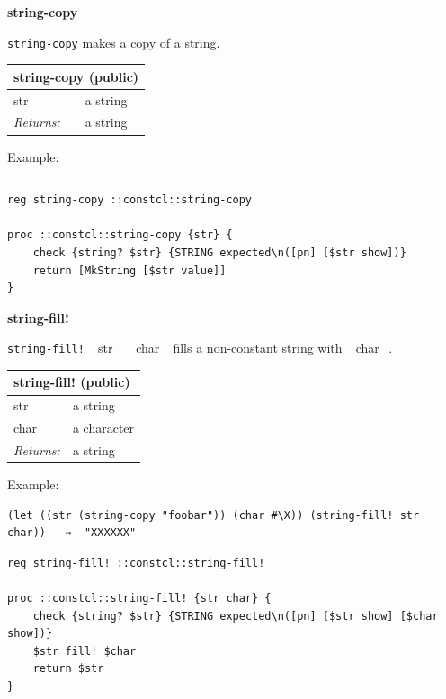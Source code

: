 \documentclass[twoside,9pt]{report}
\begin{document}
\textbf{string-copy}


\texttt{string-copy} makes a copy of a string.

\begin{tabular}{ |l l| }
\hline
\multicolumn{2}{|l|}{string-copy (public)} \\
\hline
str & a string \\
\textit{Returns:} & a string \\
\hline
\end{tabular}


Example:

\noindent\makebox[\linewidth]{\rule{\linewidth}{0.4pt}}
\begin{lstlisting}
\end{lstlisting}
\noindent\makebox[\linewidth]{\rule{\linewidth}{0.4pt}}
\noindent\makebox[\linewidth]{\rule{\linewidth}{0.4pt}}
\begin{lstlisting}
reg string-copy ::constcl::string-copy
 
proc ::constcl::string-copy {str} {
    check {string? $str} {STRING expected\n([pn] [$str show])}
    return [MkString [$str value]]
}
\end{lstlisting}
\noindent\makebox[\linewidth]{\rule{\linewidth}{0.4pt}}

\textbf{string-fill!}


\texttt{string-fill!} \_str\_ \_char\_ fills a non-constant string with \_char\_.

\begin{tabular}{ |l l| }
\hline
\multicolumn{2}{|l|}{string-fill! (public)} \\
\hline
str & a string \\
char & a character \\
\textit{Returns:} & a string \\
\hline
\end{tabular}


Example:

\noindent\makebox[\linewidth]{\rule{\linewidth}{0.4pt}}
\begin{lstlisting}
(let ((str (string-copy "foobar")) (char #\X)) (string-fill! str char))   ⇒  "XXXXXX"
\end{lstlisting}
\noindent\makebox[\linewidth]{\rule{\linewidth}{0.4pt}}
\noindent\makebox[\linewidth]{\rule{\linewidth}{0.4pt}}
\begin{lstlisting}
reg string-fill! ::constcl::string-fill!
 
proc ::constcl::string-fill! {str char} {
    check {string? $str} {STRING expected\n([pn] [$str show] [$char show])}
    $str fill! $char
    return $str
}
\end{lstlisting}
\noindent\makebox[\linewidth]{\rule{\linewidth}{0.4pt}}
\end{document}
